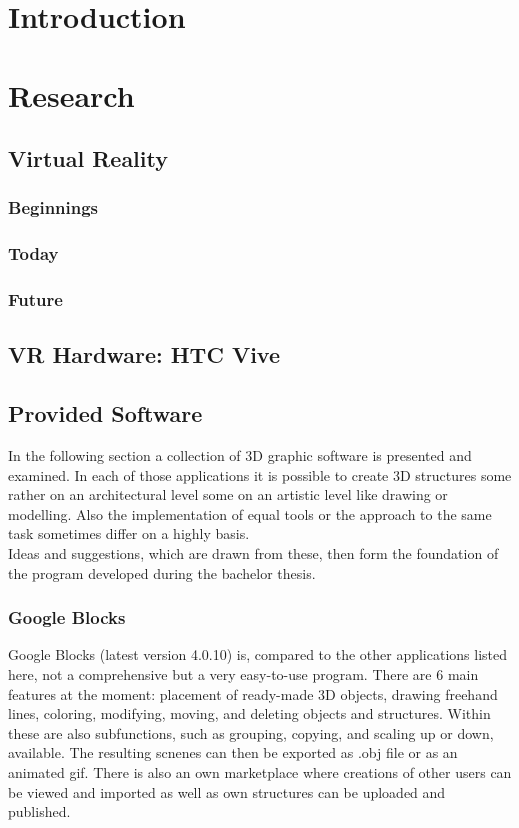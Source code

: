 \documentclass{report}
\begin{document}
\tableofcontents

\chapter{Introduction}

\chapter{Research}

	\section{Virtual Reality}
		\subsection{Beginnings}
		\subsection{Today}
		\subsection{Future}
		
	\section{VR Hardware: HTC Vive}
	
	\section{Provided Software}
		In the following section a collection of 3D graphic software is presented and examined. In each of those applications it is possible to create 3D structures some rather on an architectural level some on an artistic level like drawing or modelling. Also the implementation of equal tools or the approach to the same task sometimes differ on a highly basis. \\
		Ideas and suggestions, which are drawn from these, then form the foundation of the program developed during the bachelor thesis.
		\subsection[Google Blocks]{Google Blocks \textsc{\small{\cite{GB4}}}}
			Google Blocks (latest version 4.0.10) is, compared to the other applications listed here, not a comprehensive but a very easy-to-use program. There are 6 main features at the moment: placement of ready-made 3D objects, drawing freehand lines, coloring, modifying, moving, and deleting objects and structures. Within these are also subfunctions, such as grouping, copying, and scaling up or down, available. The resulting scnenes can then be exported as .obj file or as an animated gif. There is also an own marketplace where creations of other users can be viewed and imported as well as own structures can be uploaded and published.
\end{document}
